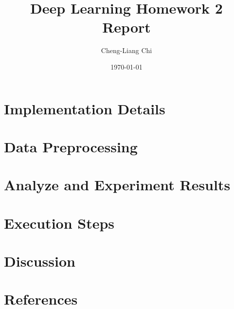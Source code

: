 \documentclass[12pt,a4paper]{article}
\title{Deep Learning Homework 2 Report}
\author{Cheng-Liang Chi}
\date{\today}
\begin{document}
\maketitle
\tableofcontents
\newpage



\section{Implementation Details}


\section{Data Preprocessing}


\section{Analyze and Experiment Results}


\section{Execution Steps}


\section{Discussion}


\section{References}
\printbibliography
\end{document}
